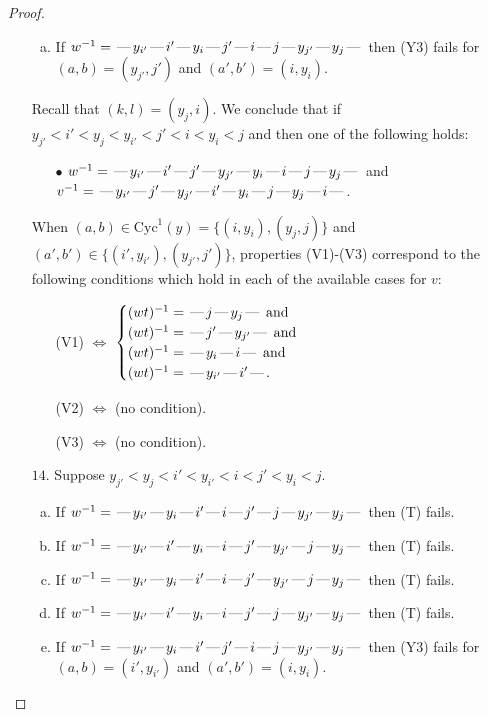 \documentclass[10pt]{article}
\theoremstyle{definition}
\theoremstyle{definition}
\def\dash{\text{\hspace{0.5mm}---\hspace{0.5mm}}}
\def\Cyc{\mathrm{Cyc}}
\begin{document}
\begin{proof}
\begin{enumerate}
\begin{enumerate}[(a)]
\item If $w^{-1} = \dash y_{i'}\dash i'\dash y_i\dash j'\dash i\dash j\dash y_{j'}\dash y_j\dash $ then (Y3) fails for $(a,b)=(y_{j'},j')$ and $(a',b')=(i,y_i)$.
\end{enumerate}
Recall that $(k,l) = (y_j,i)$.
We conclude that if $y_{j'} < i' < y_j < y_{i'} < j' < i < y_i < j$ and then one of the following holds:
\begin{enumerate}
\item[$\bullet$] $w^{-1} = \dash y_{i'}\dash i'\dash j'\dash y_{j'}\dash y_i\dash i\dash j\dash y_j\dash $ and $v^{-1} = \dash y_{i'}\dash j'\dash y_{j'}\dash i'\dash y_i\dash j\dash y_j\dash i\dash $.
\end{enumerate}
When $(a,b)\in\Cyc^1(y)=\{(i,y_i),(y_j,j)\}$ and $(a',b')\in\{(i',y_{i'}),(y_{j'},j')\}$,
properties (V1)-(V3) correspond to the following conditions which hold in
each of the available cases for $v$:
\begin{enumerate}
\item[](V1) $\Leftrightarrow$ $\begin{cases}\text{$(wt)^{-1} = \dash j \dash y_j \dash$}\text{ and }\\
\text{$(wt)^{-1} = \dash j' \dash y_{j'} \dash$}\text{ and }\\
\text{$(wt)^{-1} = \dash y_i \dash i \dash$}\text{ and }\\
\text{$(wt)^{-1} = \dash y_{i'} \dash i' \dash$}.\end{cases}$
\item[](V2) $\Leftrightarrow$ (no condition).
\item[](V3) $\Leftrightarrow$ (no condition).
\end{enumerate}
\item[$14$.] Suppose $y_{j'} < y_j < i' < y_{i'} < i < j' < y_i < j$.
\begin{enumerate}[(a)]
\item If $w^{-1} = \dash y_{i'}\dash y_i\dash i'\dash i\dash j'\dash j\dash y_{j'}\dash y_j\dash $ then (T) fails.
\item If $w^{-1} = \dash y_{i'}\dash i'\dash y_i\dash i\dash j'\dash y_{j'}\dash j\dash y_j\dash $ then (T) fails.
\item If $w^{-1} = \dash y_{i'}\dash y_i\dash i'\dash i\dash j'\dash y_{j'}\dash j\dash y_j\dash $ then (T) fails.
\item If $w^{-1} = \dash y_{i'}\dash i'\dash y_i\dash i\dash j'\dash j\dash y_{j'}\dash y_j\dash $ then (T) fails.
\item If $w^{-1} = \dash y_{i'}\dash y_i\dash i'\dash j'\dash i\dash j\dash y_{j'}\dash y_j\dash $ then (Y3) fails for $(a,b)=(i',y_{i'})$ and $(a',b')=(i,y_i)$.

\end{enumerate}
\end{enumerate}
\end{proof}
\end{document}
